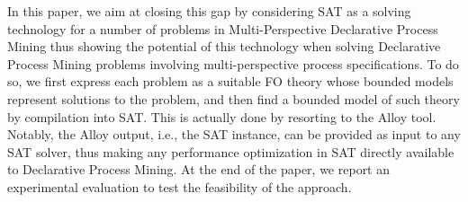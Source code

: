 In this paper, we aim at closing this gap by considering SAT as a solving technology for a number of problems in Multi-Perspective Declarative Process Mining thus showing the potential of this technology when solving Declarative Process Mining problems involving multi-perspective process specifications.
To do so, we first express each problem as a suitable FO theory whose bounded models represent solutions to the problem, and then find a bounded model of such theory by compilation into SAT. This is actually done by resorting to the Alloy tool.
Notably, the Alloy output, i.e., the SAT instance, can be provided as input to any SAT solver, thus making any performance optimization in SAT directly available to Declarative Process Mining.
At the end of the paper, we report an experimental evaluation to test the feasibility of the approach.




